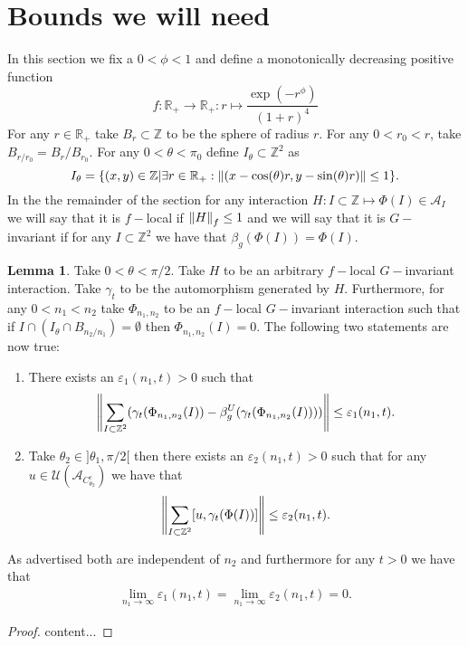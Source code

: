 \documentclass[12pt,a4paper,twoside]{article}
\newcommand{\UU}{\mathcal U}
\newcommand{\ZZ}{\mathbb Z}
\renewcommand{\AA}{\mathcal A}
\newcommand{\RR}{\mathbb R}
\theoremstyle{definition}
\newtheorem{lemma}[theorem]{Lemma}
\numberwithin{equation}{section}
\begin{document}
\section{Bounds we will need}
In this section we fix a $0<\phi<1$ and define a monotonically decreasing positive function
\begin{equation}
	f:\RR_+\rightarrow \RR_+:r\mapsto \frac{\exp(-r^{\phi})}{(1+r)^{4}}
\end{equation}
For any $r\in\RR_+$ take $B_r\subset\ZZ$ to be the sphere of radius $r$. For any $0<r_0<r$, take $B_{r/r_0}=B_{r}/B_{r_0}$. For any $0<\theta<\pi_0$ define $I_{\theta}\subset \ZZ^2$ as
\begin{equation}
	I_{\theta}=\{(x,y)\in\ZZ|\exists r\in\RR_+:\norm{(x-\cos(\theta)r,y-\sin(\theta)r)}\leq 1\}.
\end{equation}
In the the remainder of the section for any interaction $H:I\subset\ZZ\mapsto \Phi(I)\in \AA_I$ we will say that it is $f-$local if $\norm{H}_f\leq 1$ and we will say that it is $G-$invariant if for any $I\subset \ZZ^{2}$ we have that $\beta_g(\Phi(I))=\Phi(I).$
\begin{lemma}\label{lem:Bound1}
	Take $0<\theta<\pi/2$. Take $H$ to be an arbitrary $f-$local $G-$invariant interaction. Take $\gamma_t$ to be the automorphism generated by $H$. Furthermore, for any $0<n_1<n_2$ take $\Phi_{n_1,n_2}$ to be an $f-$local $G-$invariant interaction such that if $I\cap (I_\theta\cap B_{n_2/n_1})=\emptyset$ then $\Phi_{n_1,n_2}(I)=0$. The following two statements are now true:
	\begin{enumerate}
		\item There exists an $\varepsilon_{1}(n_1,t)>0$ such that
		\begin{equation}
			\norm{\sum_{I\subset \ZZ^2}(\gamma_t(\Phi_{n_1,n_2}(I))-\beta_g^U(\gamma_t(\Phi_{n_1,n_2}(I))))}\leq \varepsilon_{1}(n_1,t).
		\end{equation}
		\item Take $\theta_2\in]\theta_1,\pi/2[$ then there exists an $\varepsilon_{2}(n_1,t)>0$ such that for any $u\in\UU(\AA_{C_{\theta_2}^c})$ we have that
		\begin{equation}
			\norm{\sum_{I\subset \ZZ^2}[u,\gamma_t(\Phi(I))]}\leq \varepsilon_2(n_1,t).
		\end{equation}
	\end{enumerate}
	As advertised both are independent of $n_2$ and furthermore for any $t>0$ we have that
	\begin{align}
		\lim_{n_1\rightarrow\infty}\varepsilon_{1}(n_1,t)=\lim_{n_1\rightarrow\infty}\varepsilon_{2}(n_1,t)=0.
	\end{align}
\end{lemma}
\begin{proof}
	content...
\end{proof}


\end{document}
